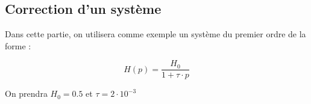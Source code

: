 \begin{enumerate}

\end{enumerate}

\subsection*{Correction d'un système}

Dans cette partie, on utilisera comme exemple un système du premier ordre de la forme : 

$$H(p) = \frac{H_0}{1 + \tau \cdot p}$$

On prendra $H_0 = 0.5$ et $\tau = 2 \cdot 10^{-3}$

